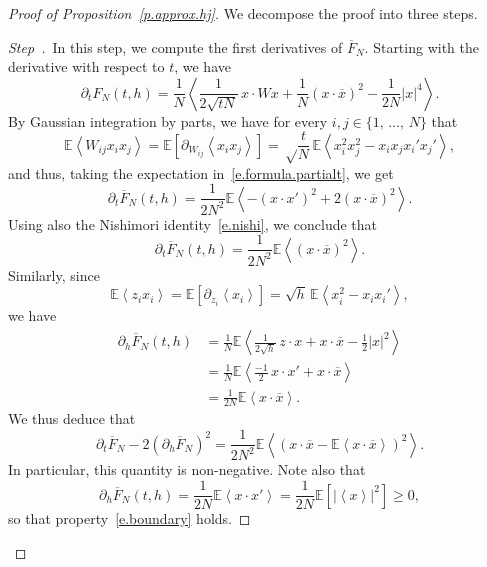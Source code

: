 \documentclass[AHL,Unicode,longabstracts,published]{cedram}
\newcommand{\E}{\mathbb{E}}
\newcommand{\1}{\mathds{1}}
\renewcommand{\ge}{\geqslant}
\newcommand{\la}{\left\langle}
\newcommand{\ra}{\right\rangle}
\renewcommand{\bar}{\overline}
\newcounter{stepcount}
\newenvironment{step}{\refstepcounter{stepcount}\begin{proof}[Step~\thestepcount]}{\let\qed\relax\end{proof}}
\begin{document}
\begin{proof}[Proof of Proposition~\ref{p.approx.hj}]
We decompose the proof into three steps.



\begin{step}\label{st1}
\,In this step, we compute the first derivatives of $\bar F_N$. Starting with the derivative with respect to $t$, we have
\begin{equation}\label{e.formula.partialt}
\partial_t F_N(t,{h}) = \frac 1 N\la \frac {1} {2\sqrt {t N}} \, x \cdot W x + \frac 1 N (x\cdot \bar x)^2 - \frac 1 {2N} |x|^4 \ra.
\end{equation}
By Gaussian integration by parts, we have for every $i,j \in \{1,\,\ldots,\,N\}$ that
\[
\E\la W_{ij} x_i x_j\ra  = \E \left[\partial_{W_{ij}} \la x_i x_j \ra \right] = \sqrt \frac{t}{N} \, \E \la x_i^2 x_j^2 - x_i x_j x_i' x_j' \ra,
\]
and thus, taking the expectation in~\eqref{e.formula.partialt}, we get
\[
\partial_t \bar F_N(t,{h}) = \frac {1}{2N^2} \E\la - \left(x \cdot x'\right)^2 + 2 \left(x\cdot \bar x\right)^2\ra.
\]
Using also the Nishimori identity~\eqref{e.nishi}, we conclude that
\begin{equation}\label{e.formula.partialtbar}
\partial_t \bar F_N(t,{h}) = \frac 1 {2N^2} \E \la (x \cdot \bar x)^2 \ra.
\end{equation}
Similarly, since
\begin{equation}\label{e.ibp.z}
\E \la z_i x_i \ra  = \E \left[\partial_{z_i} \la x_i \ra \right] = \sqrt{h} \, \E \la x_i^2 - x_i x_i' \ra,
\end{equation}
we have
\begin{align}
\partial_{h} \bar F_N(t,{h}) 
&=\frac 1 N \E \la \frac 1 {2\sqrt {h}} \, z \cdot x + x \cdot \bar x - \frac 1 2 |x|^2 \ra\label{e.formula.partialmu1}
\\
\nonumber & = \frac 1 N \E \la \frac {-1} 2 \, x \cdot x' + x \cdot \bar x \ra\\
& = \frac 1 {2N} \E \la x \cdot \bar x \ra.\label{e.formula.partialmu2}
\end{align}
We thus deduce that
\begin{equation}\label{e.variance.identity}
\partial_t \bar F_N - 2 \left(\partial_{h} \bar F_N\right)^2 = \frac 1 {2N^2} \E \la \left(x\cdot \bar x - \E\la x\cdot \bar x \ra \right)^2 \ra.
\end{equation}
In particular, this quantity is non-negative. Note also that
\begin{equation}\label{e.positivity}
\partial_h \bar F_N(t,h) = \frac 1 {2N} \E \la x \cdot x' \ra = \frac{1}{2N} \E \left[\left| \la x \ra\right|^2 \right] \ge 0,
\end{equation}
so that property~\eqref{e.boundary} holds.
\end{step}


\end{proof}
\end{document}
